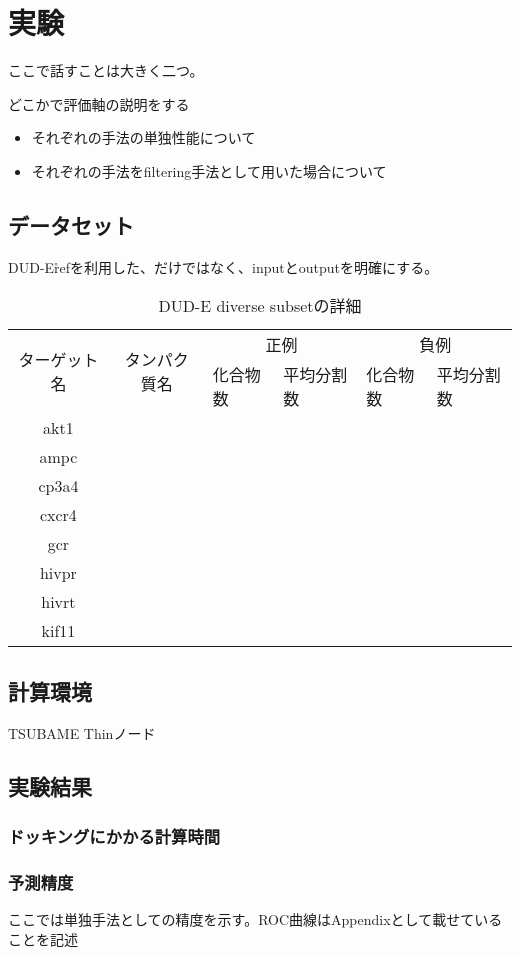 \chapter{実験}
ここで話すことは大きく二つ。

どこかで評価軸の説明をする
\begin{itemize}
\item それぞれの手法の単独性能について
\item それぞれの手法をfiltering手法として用いた場合について
\end{itemize}
\section{データセット}
DUD-E\r{ref}を利用した、だけではなく、inputとoutputを明確にする。
\begin{table}[htb] \centering
	\caption{DUD-E diverse subsetの詳細}
	\label{tb:dude_divset}
	\begin{tabular}{c|c|ll|ll|}
	\multirow{2}{*}{ターゲット名}	&\multirow{2}{*}{タンパク質名}	&\multicolumn{2}{c}{正例}	&\multicolumn{2}{c}{負例}	\\
							&							&化合物数	&平均分割数	&化合物数	&平均分割数	\\ \hline
	akt1						&							&			&			&			&			\\
	ampc					&							&			&			&			&			\\
	cp3a4					&							&			&			&			&			\\
	cxcr4					&							&			&			&			&			\\
	gcr						&							&			&			&			&			\\
	hivpr					&							&			&			&			&			\\
	hivrt						&							&			&			&			&			\\
	kif11						&							&			&			&			&			\\ \hline
	\end{tabular}
\end{table}
\section{計算環境}
TSUBAME Thinノード
\section{実験結果}
\subsection{ドッキングにかかる計算時間}
\subsection{予測精度}
ここでは単独手法としての精度を示す。ROC曲線はAppendixとして載せていることを記述

